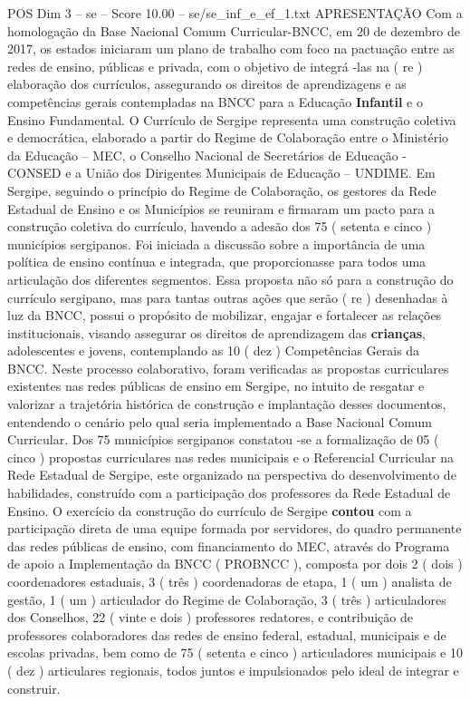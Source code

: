 \begin{textsample}{POS Dim 3 – se – Score 10.00 – se/se\_inf\_e\_ef\_1.txt}  \label{ex:f3_pos_170}
APRESENTAÇÃO Com a homologação da Base Nacional Comum Curricular-BNCC, em 20 de dezembro de 2017, os estados iniciaram um plano de trabalho com foco na pactuação entre as redes de ensino, públicas e privada, com o objetivo de integrá -las na ( re ) elaboração dos currículos, assegurando os direitos de aprendizagens e as competências gerais contempladas na BNCC para a Educação \textbf{Infantil} e o Ensino Fundamental.
O Currículo de Sergipe representa uma construção coletiva e democrática, elaborado a partir do Regime de Colaboração entre o Ministério da Educação – MEC, o Conselho Nacional de Secretários de Educação - CONSED e a União dos Dirigentes Municipais de Educação – UNDIME.
Em Sergipe, seguindo o princípio do Regime de Colaboração, os gestores da Rede Estadual de Ensino e os Municípios se reuniram e firmaram um pacto para a construção coletiva do currículo, havendo a adesão dos 75 ( setenta e cinco ) municípios sergipanos.
Foi iniciada a discussão sobre a importância de uma política de ensino contínua e integrada, que proporcionasse para todos uma articulação dos diferentes segmentos.
Essa proposta não só para a construção do currículo sergipano, mas para tantas outras ações que serão ( re ) desenhadas à luz da BNCC, possui o propósito de mobilizar, engajar e fortalecer as relações institucionais, visando assegurar os direitos de aprendizagem das \textbf{crianças}, adolescentes e jovens, contemplando as 10 ( dez ) Competências Gerais da BNCC.
Neste processo colaborativo, foram verificadas as propostas curriculares existentes nas redes públicas de ensino em Sergipe, no intuito de resgatar e valorizar a trajetória histórica de construção e implantação desses documentos, entendendo o cenário pelo qual seria implementado a Base Nacional Comum Curricular.
Dos 75 municípios sergipanos constatou -se a formalização de 05 ( cinco ) propostas curriculares nas redes municipais e o Referencial Curricular na Rede Estadual de Sergipe, este organizado na perspectiva do desenvolvimento de habilidades, construído com a participação dos professores da Rede Estadual de Ensino.
O exercício da construção do currículo de Sergipe \textbf{contou} com a participação direta de uma equipe formada por servidores, do quadro permanente das redes públicas de ensino, com financiamento do MEC, através do Programa de apoio a Implementação da BNCC ( PROBNCC ), composta por dois 2 ( dois ) coordenadores estaduais, 3 ( três ) coordenadoras de etapa, 1 ( um ) analista de gestão, 1 ( um ) articulador do Regime de Colaboração, 3 ( três ) articuladores dos Conselhos, 22 ( vinte e dois ) professores redatores, e contribuição de professores colaboradores das redes de ensino federal, estadual, municipais e de escolas privadas, bem como de 75 ( setenta e cinco ) articuladores municipais e 10 ( dez ) articulares regionais, todos juntos e impulsionados pelo ideal de integrar e construir.

\end{textsample}
